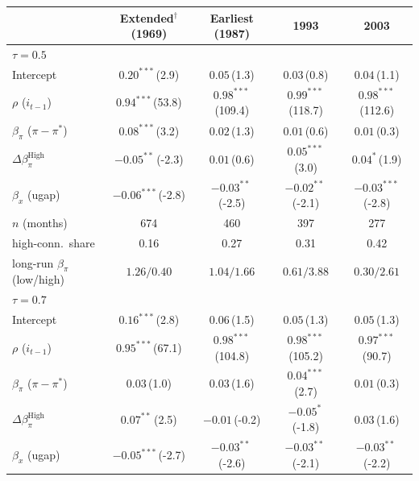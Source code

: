 \setlength{\tabcolsep}{4pt}\scriptsize
\begin{tabular}{lcccc}
\toprule
 & Extended$^{\dagger}$ (1969) & Earliest (1987) & 1993 & 2003 \\
\midrule
\multicolumn{5}{l}{\textit{$\tau=0.5$}} \\
Intercept & $0.20^{***}$\,{\scriptsize(2.9)} & $0.05$\,{\scriptsize(1.3)} & $0.03$\,{\scriptsize(0.8)} & $0.04$\,{\scriptsize(1.1)} \\
$\rho$ ($i_{t-1}$) & $0.94^{***}$\,{\scriptsize(53.8)} & $0.98^{***}$\,{\scriptsize(109.4)} & $0.99^{***}$\,{\scriptsize(118.7)} & $0.98^{***}$\,{\scriptsize(112.6)} \\
$\beta_\pi$ ($\pi-\pi^*$) & $0.08^{***}$\,{\scriptsize(3.2)} & $0.02$\,{\scriptsize(1.3)} & $0.01$\,{\scriptsize(0.6)} & $0.01$\,{\scriptsize(0.3)} \\
$\Delta\beta_\pi^{\text{High}}$ & $-0.05^{**}$\,{\scriptsize(-2.3)} & $0.01$\,{\scriptsize(0.6)} & $0.05^{***}$\,{\scriptsize(3.0)} & $0.04^{*}$\,{\scriptsize(1.9)} \\
$\beta_x$ (ugap) & $-0.06^{***}$\,{\scriptsize(-2.8)} & $-0.03^{**}$\,{\scriptsize(-2.5)} & $-0.02^{**}$\,{\scriptsize(-2.1)} & $-0.03^{***}$\,{\scriptsize(-2.8)} \\
\addlinespace
$n$ (months) & 674 & 460 & 397 & 277 \\
high-conn.\ share & 0.16 & 0.27 & 0.31 & 0.42 \\
long-run $\beta_\pi$ (low/high) & $1.26/0.40$ & $1.04/1.66$ & $0.61/3.88$ & $0.30/2.61$ \\
\midrule
\multicolumn{5}{l}{\textit{$\tau=0.7$}} \\
Intercept & $0.16^{***}$\,{\scriptsize(2.8)} & $0.06$\,{\scriptsize(1.5)} & $0.05$\,{\scriptsize(1.3)} & $0.05$\,{\scriptsize(1.3)} \\
$\rho$ ($i_{t-1}$) & $0.95^{***}$\,{\scriptsize(67.1)} & $0.98^{***}$\,{\scriptsize(104.8)} & $0.98^{***}$\,{\scriptsize(105.2)} & $0.97^{***}$\,{\scriptsize(90.7)} \\
$\beta_\pi$ ($\pi-\pi^*$) & $0.03$\,{\scriptsize(1.0)} & $0.03$\,{\scriptsize(1.6)} & $0.04^{***}$\,{\scriptsize(2.7)} & $0.01$\,{\scriptsize(0.3)} \\
$\Delta\beta_\pi^{\text{High}}$ & $0.07^{**}$\,{\scriptsize(2.5)} & $-0.01$\,{\scriptsize(-0.2)} & $-0.05^{*}$\,{\scriptsize(-1.8)} & $0.03$\,{\scriptsize(1.6)} \\
$\beta_x$ (ugap) & $-0.05^{***}$\,{\scriptsize(-2.7)} & $-0.03^{**}$\,{\scriptsize(-2.6)} & $-0.03^{**}$\,{\scriptsize(-2.1)} & $-0.03^{**}$\,{\scriptsize(-2.2)} \\

\end{tabular}
